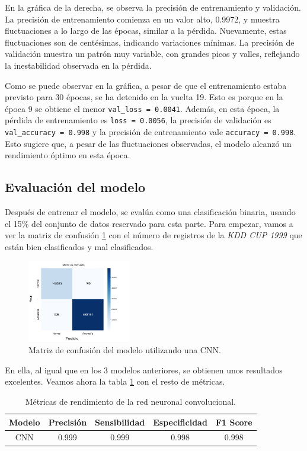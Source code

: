 En la gráfica de la derecha, se observa la precisión de entrenamiento y validación. La precisión de entrenamiento comienza en un valor alto, 0.9972, y muestra fluctuaciones a lo largo de las épocas, similar a la pérdida. Nuevamente, estas fluctuaciones son de centésimas, indicando variaciones mínimas. La precisión de validación muestra un patrón muy variable, con grandes picos y valles, reflejando la inestabilidad observada en la pérdida.

Como se puede observar en la gráfica, a pesar de que el entrenamiento estaba previsto para 30 épocas, se ha detenido en la vuelta 19. Esto es porque en la época 9 se obtiene el menor \lstinline|val_loss = 0.0041|. Además, en esta época, la pérdida de entrenamiento es \lstinline|loss = 0.0056|, la precisión de validación es \lstinline|val_accuracy = 0.998| y la precisión de entrenamiento vale \lstinline|accuracy = 0.998|. Esto sugiere que, a pesar de las fluctuaciones observadas, el modelo alcanzó un rendimiento óptimo en esta época.


\subsection{Evaluación del modelo}


Después de entrenar el modelo, se evalúa como una clasificación binaria, usando el 15\% del conjunto de datos reservado para esta parte. Para empezar, vamos a ver la matriz de confusión \ref{fig: cnnKDDConfusion} con el número de registros de la \textit{KDD CUP 1999} que están bien clasificados y mal clasificados.

\begin{figure}[H]
    \centering
    \includegraphics[width=0.4\textwidth]{img/confusionMatrixCNN_KDD.png}
    \caption{Matriz de confusión del modelo utilizando una CNN.}
    \label{fig: cnnKDDConfusion}
\end{figure}


En ella, al igual que en los 3 modelos anteriores, se obtienen unos resultados excelentes. Veamos ahora la tabla \ref{tab:kddCNN} con el resto de métricas.
\begin{table}[H]
\centering
\begin{tabular}{|c|c|c|c|c|}
\hline
Modelo & Precisión & Sensibilidad & Especificidad & F1 Score \\ \hline
CNN & 0.999 & 0.999 & 0.998 & 0.998 \\ \hline
\end{tabular}
\caption{Métricas de rendimiento de la red neuronal convolucional.}
\label{tab:kddCNN}
\end{table}

